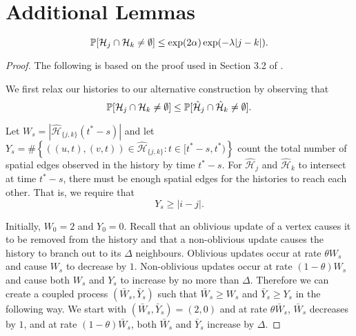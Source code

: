 \section{Additional Lemmas}
\begin{lemma}
	\label{lem:intersecting histories bound}
	\begin{equation}
		\mathbb{P}[\mathcal{H}_{j} \cap \mathcal{H}_k \neq \emptyset] \leq \exp(2\alpha) \exp(-\lambda |j - k|).
	\end{equation}
\end{lemma}
\begin{proof}
The following is based on the proof used in Section 3.2 of \cite{Lubetzky2014-po}.

We first relax our histories to our alternative construction by observing that
\begin{equation}
	\mathbb{P}[\mathcal{H}_j \cap \mathcal{H}_k \neq \emptyset] \leq \mathbb{P}[\hat{\mathcal{H}}_j \cap \hat{\mathcal{H}}_k \neq \emptyset].
\end{equation}

Let $W_s = |\hat{\mathcal{H}}_{\{j, k\}} (t^* - s)|$ and let $Y_s = \#\left\{ \left( (u,t), (v,t) \right) \in \hat{\mathcal{H}}_{\{j, k\}}: t \in [t^* - s, t^*) \right\}$ count the total number of spatial edges observed in the history by time $t^* - s$. For $\hat{\mathcal{H}}_j$ and $\hat{\mathcal{H}}_k$ to intersect at time $t^* - s$, there must be enough spatial edges for the histories to reach each other. That is, we require that
\begin{equation}
	Y_s \geq |i - j|.
\end{equation}

Initially, $W_0 = 2$ and $Y_0 = 0$. Recall that an oblivious update of a vertex causes it to be removed from the history and that a non-oblivious update causes the history to branch out to its $\Delta$ neighbours. Oblivious updates occur at rate $\theta W_s$ and cause $W_s$ to decrease by $1$. Non-oblivious updates occur at rate $(1 - \theta)W_s$ and cause both $W_s$ and $Y_s$ to increase by no more than $\Delta$. Therefore we can create a coupled process $(\bar{W}_s, \bar{Y}_s)$ such that $\bar{W}_s \geq W_s$ and $\bar{Y}_s \geq Y_s$ in the following way. We start with $(\bar{W}_s, \bar{Y}_s) = (2, 0)$ and at rate $\theta \bar{W}_s$, $\bar{W}_s$ decreases by $1$, and at rate $(1 - \theta)\bar{W}_s$, both $\bar{W}_s$ and $\bar{Y}_s$ increase by $\Delta$.


\end{proof}
